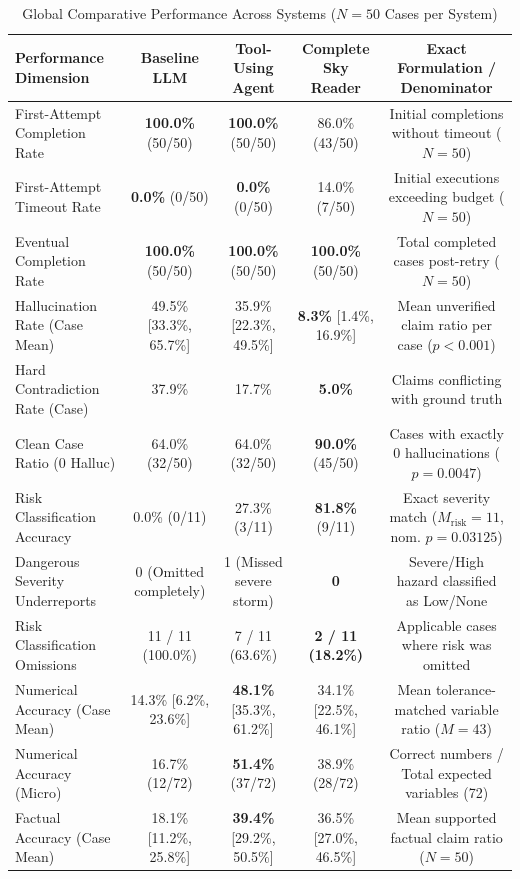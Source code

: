 \documentclass[conference]{IEEEtran}
\begin{document}
\begin{table}[t]
\caption{Global Comparative Performance Across Systems ($N=50$ Cases per System)}
\label{tab:global_results}
\centering
\begin{tabular}{lcccc}
\toprule
\textbf{Performance Dimension} & \textbf{Baseline LLM} & \textbf{Tool-Using Agent} & \textbf{Complete Sky Reader} & \textbf{Exact Formulation / Denominator} \\
\midrule
First-Attempt Completion Rate & \textbf{100.0\%} (50/50) & \textbf{100.0\%} (50/50) & 86.0\% (43/50) & Initial completions without timeout ($N=50$) \\
First-Attempt Timeout Rate & \textbf{0.0\%} (0/50) & \textbf{0.0\%} (0/50) & 14.0\% (7/50) & Initial executions exceeding budget ($N=50$) \\
Eventual Completion Rate & \textbf{100.0\%} (50/50) & \textbf{100.0\%} (50/50) & \textbf{100.0\%} (50/50) & Total completed cases post-retry ($N=50$) \\
Hallucination Rate (Case Mean) & 49.5\% [33.3\%, 65.7\%] & 35.9\% [22.3\%, 49.5\%] & \textbf{8.3\%} [1.4\%, 16.9\%] & Mean unverified claim ratio per case ($p < 0.001$) \\
Hard Contradiction Rate (Case) & 37.9\% & 17.7\% & \textbf{5.0\%} & Claims conflicting with ground truth \\
Clean Case Ratio (0 Halluc) & 64.0\% (32/50) & 64.0\% (32/50) & \textbf{90.0\%} (45/50) & Cases with exactly 0 hallucinations ($p = 0.0047$) \\
Risk Classification Accuracy & 0.0\% (0/11) & 27.3\% (3/11) & \textbf{81.8\%} (9/11) & Exact severity match ($M_{\text{risk}}=11$, nom. $p=0.03125$) \\
Dangerous Severity Underreports & 0 (Omitted completely) & 1 (Missed severe storm) & \textbf{0} & Severe/High hazard classified as Low/None \\
Risk Classification Omissions & 11 / 11 (100.0\%) & 7 / 11 (63.6\%) & \textbf{2 / 11 (18.2\%)} & Applicable cases where risk was omitted \\
Numerical Accuracy (Case Mean) & 14.3\% [6.2\%, 23.6\%] & \textbf{48.1\%} [35.3\%, 61.2\%] & 34.1\% [22.5\%, 46.1\%] & Mean tolerance-matched variable ratio ($M=43$) \\
Numerical Accuracy (Micro) & 16.7\% (12/72) & \textbf{51.4\%} (37/72) & 38.9\% (28/72) & Correct numbers / Total expected variables (72) \\
Factual Accuracy (Case Mean) & 18.1\% [11.2\%, 25.8\%] & \textbf{39.4\%} [29.2\%, 50.5\%] & 36.5\% [27.0\%, 46.5\%] & Mean supported factual claim ratio ($N=50$) \\

\end{tabular}
\end{table}
\end{document}
